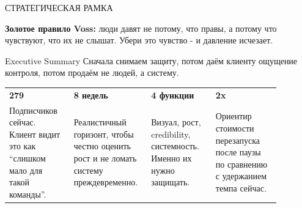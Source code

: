 \documentclass[11pt,a4paper]{article}
\newcommand{\eyebrow}[1]{{\sansfont\fontsize{8.5}{10}\selectfont\color{muted}\MakeUppercase{#1}}}
\begin{document}
\clearpage
\pagecolor{paperbg}
\color{ink}
\setcounter{page}{2}

\begin{navybox}
\eyebrow{Стратегическая рамка}\par
\vspace{1.5mm}
{\fontsize{13.4}{17}\selectfont \textbf{Золотое правило Voss:} люди давят не потому, что правы, а потому что чувствуют, что их не слышат. Убери это чувство - и давление исчезает.}
\end{navybox}

\vspace{4mm}

\begin{glassbox}
{\headingfont\fontsize{22}{24}\selectfont Executive Summary}\hfill
{\color{muted}\sansfont\fontsize{9.5}{12}\selectfont Сначала снимаем защиту, потом даём клиенту ощущение контроля, потом продаём не людей, а систему.}

\vspace{4mm}

\begin{tabularx}{\linewidth}{>{\raggedright\arraybackslash}p{0.22\linewidth} >{\raggedright\arraybackslash}p{0.22\linewidth} >{\raggedright\arraybackslash}p{0.22\linewidth} >{\raggedright\arraybackslash}p{0.22\linewidth}}
\rowcolor{paperbg}
\textbf{279} & \textbf{8 недель} & \textbf{4 функции} & \textbf{2x} \\
\fontsize{9.6}{12}\selectfont Подписчиков сейчас. Клиент видит это как ``слишком мало для такой команды''. &
\fontsize{9.6}{12}\selectfont Реалистичный горизонт, чтобы честно оценить рост и не ломать систему преждевременно. &
\fontsize{9.6}{12}\selectfont Визуал, рост, credibility, системность. Именно их нужно защищать. &
\fontsize{9.6}{12}\selectfont Ориентир стоимости перезапуска после паузы по сравнению с удержанием темпа сейчас. \\
\end{tabularx}

\vspace{5mm}


\end{glassbox}
\end{document}
